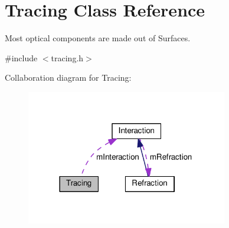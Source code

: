 \hypertarget{classTracing}{}\section{Tracing Class Reference}
\label{classTracing}


Most optical components are made out of Surfaces.  




{\ttfamily \#include $<$tracing.\+h$>$}



Collaboration diagram for Tracing\+:\nopagebreak
\begin{figure}[H]
\begin{center}
\leavevmode
\includegraphics[width=249pt]{classTracing__coll__graph}
\end{center}
\end{figure}
